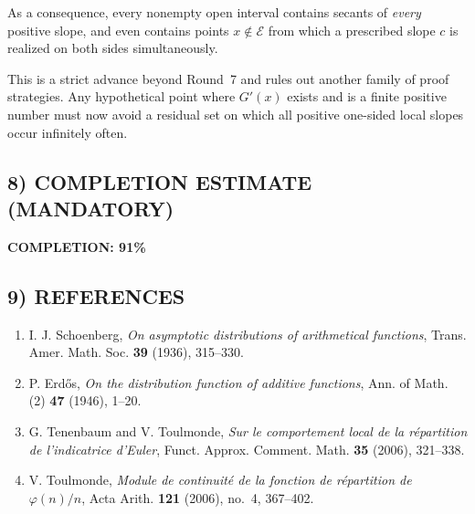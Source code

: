 As a consequence, every nonempty open interval contains secants of \emph{every} positive slope, and even contains points $x\notin\mathcal E$ from which a prescribed slope $c$ is realized on both sides simultaneously.

This is a strict advance beyond Round~7 and rules out another family of proof strategies. Any hypothetical point where $G'(x)$ exists and is a finite positive number must now avoid a residual set on which all positive one-sided local slopes occur infinitely often.

\subsection{8) COMPLETION ESTIMATE (MANDATORY)}

\textbf{COMPLETION: 91\%}

\subsection{9) REFERENCES}

\begin{enumerate}
\item I. J. Schoenberg, \emph{On asymptotic distributions of arithmetical functions}, Trans. Amer. Math. Soc. \textbf{39} (1936), 315--330.
\item P. Erd\H{o}s, \emph{On the distribution function of additive functions}, Ann. of Math. (2) \textbf{47} (1946), 1--20.
\item G. Tenenbaum and V. Toulmonde, \emph{Sur le comportement local de la r\'epartition de l'indicatrice d'Euler}, Funct. Approx. Comment. Math. \textbf{35} (2006), 321--338.
\item V. Toulmonde, \emph{Module de continuit\'e de la fonction de r\'epartition de $\varphi(n)/n$}, Acta Arith. \textbf{121} (2006), no.~4, 367--402.
\end{enumerate}
